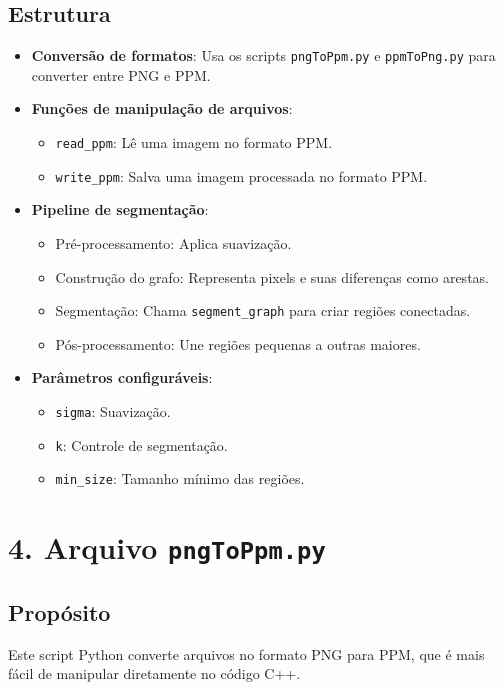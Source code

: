 \documentclass[12pt]{article}
\begin{document}
\subsection*{Estrutura}
\begin{itemize}
    \item \textbf{Conversão de formatos}:
    Usa os scripts \texttt{pngToPpm.py} e \texttt{ppmToPng.py} para converter entre PNG e PPM.
    \item \textbf{Funções de manipulação de arquivos}:
    \begin{itemize}
        \item \texttt{read\_ppm}: Lê uma imagem no formato PPM.
        \item \texttt{write\_ppm}: Salva uma imagem processada no formato PPM.
    \end{itemize}
    \item \textbf{Pipeline de segmentação}:
    \begin{itemize}
        \item Pré-processamento: Aplica suavização.
        \item Construção do grafo: Representa pixels e suas diferenças como arestas.
        \item Segmentação: Chama \texttt{segment\_graph} para criar regiões conectadas.
        \item Pós-processamento: Une regiões pequenas a outras maiores.
    \end{itemize}
    \item \textbf{Parâmetros configuráveis}:
    \begin{itemize}
        \item \texttt{sigma}: Suavização.
        \item \texttt{k}: Controle de segmentação.
        \item \texttt{min\_size}: Tamanho mínimo das regiões.
    \end{itemize}
\end{itemize}

\section*{4. Arquivo \texttt{pngToPpm.py}}
\subsection*{Propósito}
Este script Python converte arquivos no formato PNG para PPM, que é mais fácil de manipular diretamente no código C++.
\end{document}
